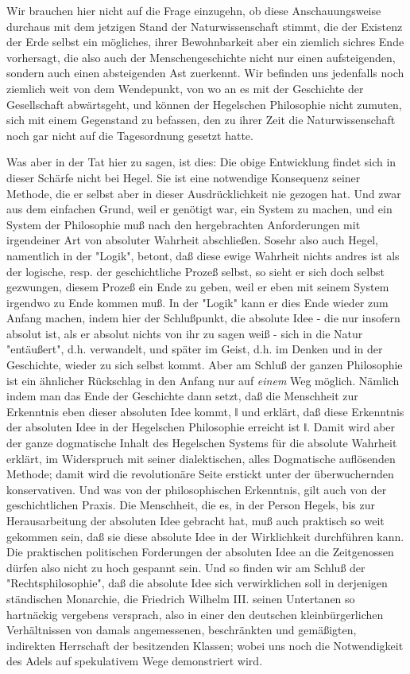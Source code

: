 Wir brauchen hier nicht auf die Frage einzugehn, ob diese
Anschauungsweise durchaus mit dem jetzigen Stand der Naturwissenschaft
stimmt, die der Existenz der Erde selbst ein mögliches, ihrer
Bewohnbarkeit aber ein ziemlich sichres Ende vorhersagt, die also auch
der Menschengeschichte nicht nur einen aufsteigenden, sondern auch einen
absteigenden Ast zuerkennt. Wir befinden uns jedenfalls noch ziemlich
weit von dem Wendepunkt, von wo an es mit der Geschichte der
Gesellschaft abwärtsgeht, und können der Hegelschen Philosophie nicht
zumuten, sich mit einem Gegenstand zu befassen, den zu ihrer Zeit die
Naturwissenschaft noch gar nicht auf die Tagesordnung gesetzt hatte.

Was aber in der Tat hier zu sagen, ist dies: Die obige
Entwicklung findet sich in dieser Schärfe nicht bei Hegel. Sie ist eine
notwendige Konsequenz seiner Methode, die er selbst aber in dieser
Ausdrücklichkeit nie gezogen hat. Und zwar aus dem einfachen Grund, weil
er genötigt war, ein System zu machen, und ein System der Philosophie
muß nach den hergebrachten Anforderungen mit irgendeiner Art von
absoluter Wahrheit abschließen. Sosehr also auch Hegel, namentlich in
der "Logik", betont, daß diese ewige Wahrheit nichts andres ist als der
logische, resp. der geschichtliche Prozeß selbst, so sieht er sich doch
selbst gezwungen, diesem Prozeß ein Ende zu geben, weil er eben mit
seinem System irgendwo zu Ende kommen muß. In der "Logik" kann er dies
Ende wieder zum Anfang machen, indem hier der Schlußpunkt, die absolute
Idee - die nur insofern absolut ist, als er absolut nichts von ihr zu
sagen weiß - sich in die Natur "entäußert", d.h. verwandelt, und später
im Geist, d.h. im Denken und in der Geschichte, wieder zu sich selbst
kommt. Aber am Schluß der ganzen Philosophie ist ein ähnlicher
Rückschlag in den Anfang nur auf \emph{einem} Weg möglich. Nämlich indem
man das Ende der Geschichte dann setzt, daß die Menschheit zur
Erkenntnis eben dieser absoluten Idee kommt, ǁ und erklärt, daß diese
Erkenntnis der absoluten Idee in der Hegelschen Philosophie erreicht ist
ǁ. Damit wird aber der ganze dogmatische Inhalt des Hegelschen Systems
für die absolute Wahrheit erklärt, im Widerspruch mit seiner
dialektischen, alles Dogmatische auflösenden Methode; damit wird die
revolutionäre Seite erstickt unter der überwuchernden konservativen. Und
was von der philosophischen Erkenntnis, gilt auch von der
geschichtlichen Praxis. Die Menschheit, die es, in der Person Hegels,
bis zur Herausarbeitung der absoluten Idee gebracht hat, muß auch
praktisch so weit gekommen sein, daß sie diese absolute Idee in der
Wirklichkeit durchführen kann. Die praktischen politischen Forderungen
der absoluten Idee an die Zeitgenossen dürfen also nicht zu hoch
gespannt sein. Und so finden wir am Schluß der "Rechtsphilosophie", daß
die absolute Idee sich verwirklichen soll in derjenigen ständischen
Monarchie, die Friedrich Wilhelm III. seinen Untertanen so hartnäckig
vergebens versprach, also in einer den deutschen kleinbürgerlichen
Verhältnissen von damals angemessenen, beschränkten und gemäßigten,
indirekten Herrschaft der besitzenden Klassen; wobei uns noch die
Notwendigkeit des Adels auf spekulativem Wege demonstriert wird.

